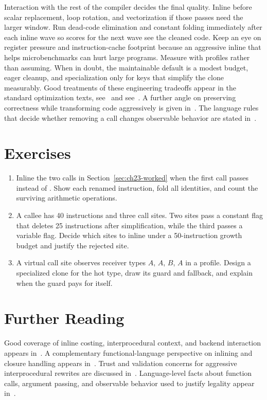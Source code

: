 Interaction with the rest of the compiler decides the final quality.
Inline before scalar replacement, loop rotation, and vectorization if those passes need the larger window.
Run dead-code elimination and constant folding immediately after each inline wave so scores for the next wave see the cleaned code.
Keep an eye on register pressure and instruction-cache footprint because an aggressive inline that helps microbenchmarks can hurt large programs.
Measure with profiles rather than assuming.
When in doubt, the maintainable default is a modest budget, eager cleanup, and specialization only for keys that simplify the clone measurably.
Good treatments of these engineering tradeoffs appear in the standard optimization texts, see~\cite{appel-1998-modern} and see~\cite{morgan-1998-optimizing}.
A further angle on preserving correctness while transforming code aggressively is given in~\cite{safonov-2010-trustworthy}.
The language rules that decide whether removing a call changes observable behavior are stated in~\cite{wg14-2011-c11}.

\section{Exercises}\label{sec:ch23-exercises}

\begin{enumerate}
\item Inline the two calls in Section~\ref{sec:ch23-worked} when the first call passes  instead of . \label{ex:ch23-fold-identity} Show each renamed instruction, fold all identities, and count the surviving arithmetic operations.
\item A callee has 40 instructions and three call sites. \label{ex:ch23-budget} Two sites pass a constant flag that deletes 25 instructions after simplification, while the third passes a variable flag. Decide which sites to inline under a 50-instruction growth budget and justify the rejected site.
\item A virtual call site observes receiver types $A$, $A$, $B$, $A$ in a profile. \label{ex:ch23-spec-guard} Design a specialized clone for the hot type, draw its guard and fallback, and explain when the guard pays for itself.
\end{enumerate}

\section{Further Reading}\label{sec:ch23-reading}

Good coverage of inline costing, interprocedural context, and backend interaction appears in~\cite{morgan-1998-optimizing}.
A complementary functional-language perspective on inlining and closure handling appears in~\cite{appel-1998-modern}.
Trust and validation concerns for aggressive interprocedural rewrites are discussed in~\cite{safonov-2010-trustworthy}.
Language-level facts about function calls, argument passing, and observable behavior used to justify legality appear in~\cite{wg14-2011-c11}.
